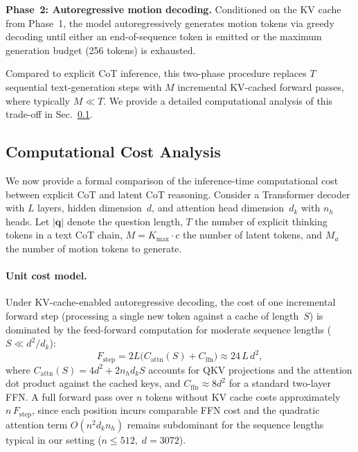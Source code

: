 \noindent\textbf{Phase~2: Autoregressive motion decoding.}
Conditioned on the KV cache from Phase~1, the model autoregressively
generates motion tokens via greedy decoding until either an end-of-sequence
token is emitted or the maximum generation budget (256 tokens) is
exhausted.

Compared to explicit CoT inference, this two-phase procedure replaces $T$
sequential text-generation steps with $M$ incremental KV-cached forward
passes, where typically $M{\ll}T$.
We provide a detailed computational analysis of this trade-off in
Sec.~\ref{sec:cost_analysis}.

\subsection{Computational Cost Analysis}
\label{sec:cost_analysis}

We now provide a formal comparison of the inference-time computational
cost between explicit CoT and latent CoT reasoning.
Consider a Transformer decoder with $L$ layers, hidden dimension~$d$,
and attention head dimension~$d_k$ with $n_h$ heads.
Let $|\mathbf{q}|$ denote the question length, $T$ the number of
explicit thinking tokens in a text CoT chain, $M{=}K_{\max}{\cdot}c$ the
number of latent tokens, and $M_a$ the number of motion tokens to
generate.

\paragraph{Unit cost model.}
Under KV-cache-enabled autoregressive decoding, the cost of one
incremental forward step (processing a single new token against a
cache of length~$S$) is dominated by the feed-forward computation for
moderate sequence lengths ($S\ll d^2/d_k$):
%
\begin{equation}
  F_{\mathrm{step}}
  = 2L\bigl(C_{\mathrm{attn}}(S) + C_{\mathrm{ffn}}\bigr)
  \approx 24\,L\,d^2,
  \label{eq:step_cost}
\end{equation}
%
where $C_{\mathrm{attn}}(S){=}4d^2 + 2n_h d_k S$ accounts for
QKV projections and the attention dot product against the cached keys,
and $C_{\mathrm{ffn}}{\approx}8d^2$ for a standard two-layer FFN\@.
A full forward pass over $n$ tokens without KV cache costs approximately
$n\,F_{\mathrm{step}}$, since each position incurs comparable FFN cost
and the quadratic attention term $O(n^2 d_k n_h)$ remains subdominant
for the sequence lengths typical in our setting
($n{\leq}512,\;d{=}3072$).

